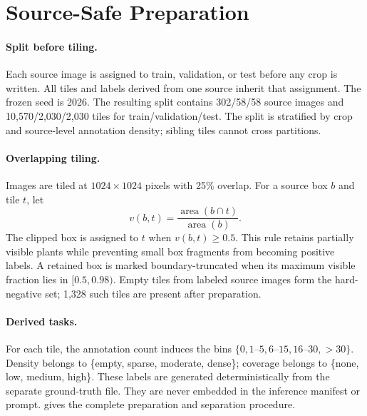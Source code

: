 \section{Source-Safe Preparation}
\label{sec:preparation}

\paragraph{Split before tiling.}
Each source image is assigned to train, validation, or test before any crop is
written.  All tiles and labels derived from one source inherit that assignment.
The frozen seed is 2026.  The resulting split contains 302/58/58 source images
and 10,570/2,030/2,030 tiles for train/validation/test.  The split is stratified
by crop and source-level annotation density; sibling tiles cannot cross
partitions.

\paragraph{Overlapping tiling.}
Images are tiled at $1024\!\times\!1024$ pixels with 25\% overlap.  For a source
box $b$ and tile $t$, let
\begin{equation}
v(b,t)=\frac{\operatorname{area}(b\cap t)}{\operatorname{area}(b)}.
\label{eq:visible}
\end{equation}
The clipped box is assigned to $t$ when $v(b,t)\geq0.5$.  This rule retains
partially visible plants while preventing small box fragments from becoming
positive labels.  A retained box is marked boundary-truncated when its maximum
visible fraction lies in $[0.5,0.98)$.  Empty tiles from labeled source images
form the hard-negative set; 1,328 such tiles are present after preparation.

\paragraph{Derived tasks.}
For each tile, the annotation count induces the bins
\(\{0,1\text{--}5,6\text{--}15,16\text{--}30,{>}30\}\).
Density belongs to \{empty, sparse, moderate, dense\}; coverage belongs to
\{none, low, medium, high\}.  These labels are generated deterministically from
the separate ground-truth file.  They are never embedded in the inference
manifest or prompt.   gives the complete preparation and
separation procedure.


